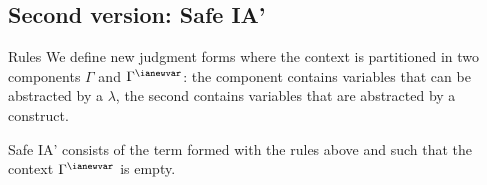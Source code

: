 \subsection{Second version: Safe IA'}

Rules We define new judgment forms where the context is partitioned
in two components $\Gamma$ and $\Gamma^{\ianewvar}$: the component
contains variables that can be abstracted by a $\lambda$, the second
contains variables that are abstracted by a \ianewvar construct.


Safe IA' consists of the term formed with the rules above and such
that the context $\Gamma^{\ianewvar}$ is empty.


